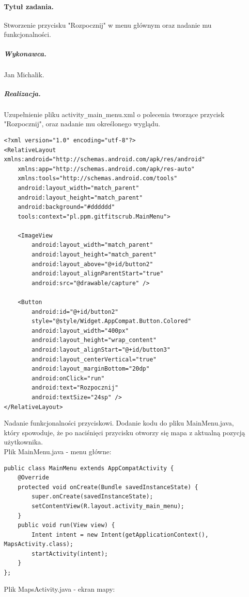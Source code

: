 \documentclass[a4paper]{article}
\begin{document}
\paragraph{Tytuł zadania.} Stworzenie przycisku "Rozpocznij" w menu głównym oraz nadanie mu funkcjonalności.
\subparagraph{Wykonawca.} Jan Michalik.
\subparagraph{Realizacja.} Uzupełnienie pliku activity\verb|_|main\verb|_|menu.xml o polecenia tworzące przycisk "Rozpocznij", oraz nadanie mu określonego wyglądu.
\begin{lstlisting}[style=xml]
<?xml version="1.0" encoding="utf-8"?>
<RelativeLayout xmlns:android="http://schemas.android.com/apk/res/android"
    xmlns:app="http://schemas.android.com/apk/res-auto"
    xmlns:tools="http://schemas.android.com/tools"
    android:layout_width="match_parent"
    android:layout_height="match_parent"
    android:background="#dddddd"
    tools:context="pl.ppm.gitfitscrub.MainMenu">

    <ImageView
        android:layout_width="match_parent"
        android:layout_height="match_parent"
        android:layout_above="@+id/button2"
        android:layout_alignParentStart="true"
        android:src="@drawable/capture" />

    <Button
        android:id="@+id/button2"
        style="@style/Widget.AppCompat.Button.Colored"
        android:layout_width="400px"
        android:layout_height="wrap_content"
        android:layout_alignStart="@+id/button3"
        android:layout_centerVertical="true"
        android:layout_marginBottom="20dp"
        android:onClick="run"
        android:text="Rozpocznij"
		android:textSize="24sp" />
</RelativeLayout>

\end{lstlisting}
Nadanie funkcjonalności przyciskowi. Dodanie kodu do pliku MainMenu.java, który spowoduje, że po naciśnięci przycisku otworzy się mapa z aktualną pozycją użytkownika.\\
Plik MainMenu.java - menu główne:
\begin{lstlisting}[style=java]
	public class MainMenu extends AppCompatActivity {
    @Override
    protected void onCreate(Bundle savedInstanceState) {
        super.onCreate(savedInstanceState);
        setContentView(R.layout.activity_main_menu);
    }
    public void run(View view) {
        Intent intent = new Intent(getApplicationContext(), MapsActivity.class);
        startActivity(intent);
    }
};
\end{lstlisting}
Plik MapsActivity.java - ekran mapy:
\end{document}
